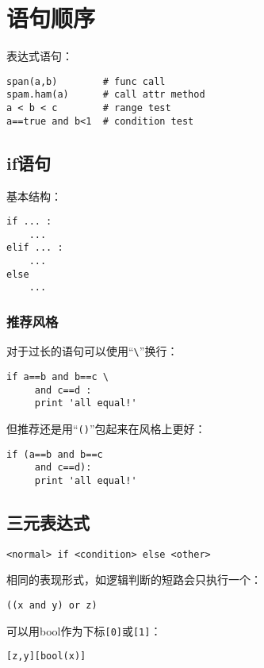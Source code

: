 
\chapter{语句顺序}

表达式语句：

\begin{lstlisting}
span(a,b)        # func call
spam.ham(a)      # call attr method
a < b < c        # range test
a==true and b<1  # condition test
\end{lstlisting}

\section{if语句}

基本结构：

\begin{lstlisting}
if ... :
	...
elif ... :
	...
else
	...
\end{lstlisting}

\subsection{推荐风格}

对于过长的语句可以使用“\verb|\|”换行：

\begin{lstlisting}
if a==b and b==c \
	 and c==d :
	 print 'all equal!'
\end{lstlisting}

但推荐还是用“\verb|()|”包起来在风格上更好：

\begin{lstlisting}
if (a==b and b==c
	 and c==d):
	 print 'all equal!'
\end{lstlisting}

\section{三元表达式}

\begin{lstlisting}
<normal> if <condition> else <other>
\end{lstlisting}

相同的表现形式，如逻辑判断的短路会只执行一个：
\begin{lstlisting}
((x and y) or z)
\end{lstlisting}

可以用bool作为下标\verb|[0]|或\verb|[1]|：
\begin{lstlisting}
[z,y][bool(x)]
\end{lstlisting}

